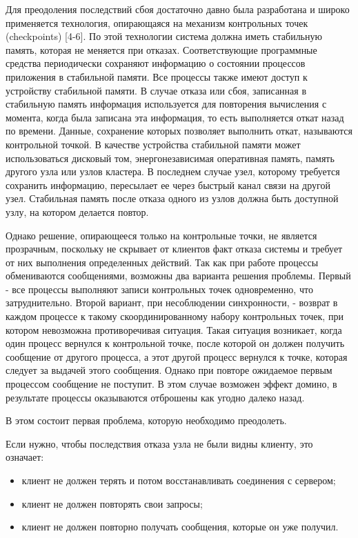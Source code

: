 \begin{multicols}{2}
Для преодоления последствий сбоя достаточно давно была разработана и широко применяется технология, опирающаяся на механизм контрольных точек (checkpoints) [4-6]. По этой технологии система должна иметь стабильную память, которая не меняется при отказах. Соответствующие программные средства периодически сохраняют информацию о состоянии процессов приложения в стабильной памяти. Все процессы также имеют доступ к устройству стабильной памяти.  В случае отказа или сбоя, записанная в стабильную память информация используется для повторения вычисления с момента, когда была записана эта информация, то есть выполняется откат назад по времени. Данные, сохранение которых позволяет выполнить откат, называются контрольной точкой. В качестве устройства стабильной памяти может использоваться дисковый том, энергонезависимая оперативная память, память другого узла или узлов кластера. В последнем случае узел, которому требуется сохранить информацию, пересылает ее через быстрый канал связи на другой узел. Стабильная память после отказа одного из узлов должна быть доступной узлу, на котором делается повтор.

Однако решение, опирающееся только на контрольные точки, не является прозрачным, поскольку не скрывает от клиентов факт отказа системы и требует от них выполнения определенных действий. Так как при работе процессы обмениваются сообщениями, возможны два варианта решения проблемы. Первый - все процессы выполняют записи контрольных точек одновременно, что затруднительно. Второй вариант, при несоблюдении синхронности, - возврат в каждом процессе к такому скоординированному набору контрольных точек, при котором невозможна противоречивая ситуация. Такая ситуация возникает, когда один процесс вернулся к контрольной точке, после которой он должен получить сообщение от другого процесса, а этот другой процесс вернулся к точке, которая следует за выдачей этого сообщения. Однако при повторе ожидаемое первым процессом сообщение не поступит. В этом случае  возможен эффект домино, в результате процессы оказываются отброшены как угодно далеко назад.

В этом состоит первая проблема, которую необходимо преодолеть.

Если нужно, чтобы последствия отказа узла не были видны клиенту,  это означает:
\begin{itemize}
\item клиент не должен терять и потом восстанавливать соединения с сервером;
\item клиент не должен повторять свои запросы;
\item клиент не должен повторно получать сообщения, которые он уже получил.
\end{itemize}


\end{multicols}
